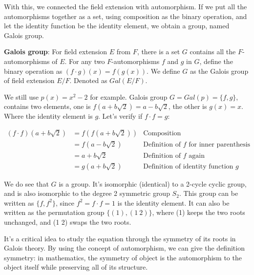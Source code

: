 \documentclass[b5paper]{article}
\begin{document}
With this, we connected the field extension with automorphism. If we put all the automorphisms together as a set, using composition as the binary operation, and let the identity function be the identity element, we obtain a group, named Galois group.

\begin{definition}
\textbf{Galois group}: For field extension $E$ from $F$, there is a set $G$ contains all the $F$-automorphisms of $E$. For any two $F$-automorphisms $f$ and $g$ in $G$, define the binary operation as $(f \cdot g)(x) = f(g(x))$. We define $G$ as the Galois group of field extension $E/F$. Denoted as $Gal(E/F)$.
\end{definition}

We still use $p(x) = x^2 - 2$ for example. Galois group $G = Gal(p) = \{f, g\}$, contains two elements, one is $f(a + b\sqrt{2}) = a - b\sqrt{2}$, the other is $g(x) = x$. Where the identity element is $g$. Let's verify if $f \cdot f = g$:

\[
\begin{array}{rll}
(f \cdot f)(a + b\sqrt{2}) & = f(f(a + b\sqrt{2})) & \text{Composition} \\
  & = f(a - b\sqrt{2}) & \text{Definition of $f$ for inner parenthesis} \\
  & = a + b\sqrt{2} & \text{Definition of $f$ again} \\
  & = g(a + b\sqrt{2}) & \text{Definition of identity function $g$}
\end{array}
\]

We do see that $G$ is a group. It's isomorphic (identical) to a 2-cycle cyclic group, and is also isomorphic to the degree 2 symmetric group $S_2$. This group can be written as $\{f, f^2\}$, since $f^2 = f \cdot f = 1$ is the identity element. It can also be written as the permutation group $\{(1), (1\ 2)\}$, where (1) keeps the two roots unchanged, and (1 2) swaps the two roots.

\begin{mdframed}
It's a critical idea to study the equation through the symmetry of its roots in Galois theory. By using the concept of automorphism, we can give the definition symmetry: in mathematics, the symmetry of object is the automorphism to the object itself while preserving all of its structure.
\end{mdframed}

\begin{Exercise}
\end{Exercise}
\end{document}
